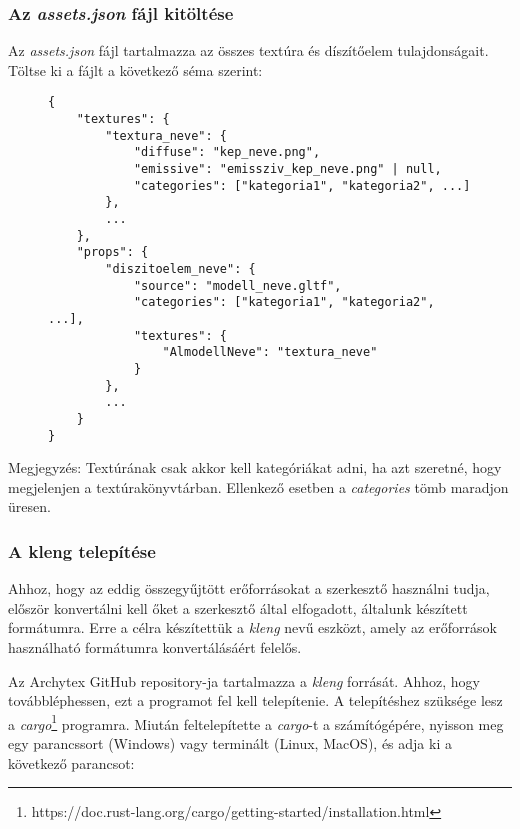 \subsubsection{Az \emph{assets.json} fájl kitöltése}

Az \emph{assets.json} fájl tartalmazza az összes textúra és díszítőelem tulajdonságait. Töltse ki
a fájlt a következő séma szerint:

\begin{figure}[h]
    \centering
    \begin{minipage}{.85\textwidth}
        \centering
        \begin{lstlisting}
{
    "textures": {
        "textura_neve": {
            "diffuse": "kep_neve.png",
            "emissive": "emissziv_kep_neve.png" | null,
            "categories": ["kategoria1", "kategoria2", ...]
        },
        ...
    },
    "props": {
        "diszitoelem_neve": {
            "source": "modell_neve.gltf",
            "categories": ["kategoria1", "kategoria2", ...],
            "textures": {
                "AlmodellNeve": "textura_neve"
            }
        },
        ...
    }
}
\end{lstlisting}
    \end{minipage}
\end{figure}

Megjegyzés: Textúrának csak akkor kell kategóriákat adni, ha azt szeretné, hogy megjelenjen a
textúrakönyvtárban. Ellenkező esetben a \emph{categories} tömb maradjon üresen.

\pagebreak

\subsubsection{A kleng telepítése}

Ahhoz, hogy az eddig összegyűjtött erőforrásokat a szerkesztő használni tudja, először konvertálni
kell őket a szerkesztő által elfogadott, általunk készített formátumra. Erre a célra készítettük
a \emph{kleng} nevű eszközt, amely az erőforrások használható formátumra konvertálásáért felelős.

Az Archytex GitHub repository-ja tartalmazza a \emph{kleng} forrását. Ahhoz, hogy továbbléphessen,
ezt a programot fel kell telepítenie. A telepítéshez szüksége lesz a
\emph{cargo}\footnote{https://doc.rust-lang.org/cargo/getting-started/installation.html}
programra. Miután feltelepítette a \emph{cargo}-t a számítógépére, nyisson meg egy parancssort
(Windows) vagy terminált (Linux, MacOS), és adja ki a következő parancsot:

